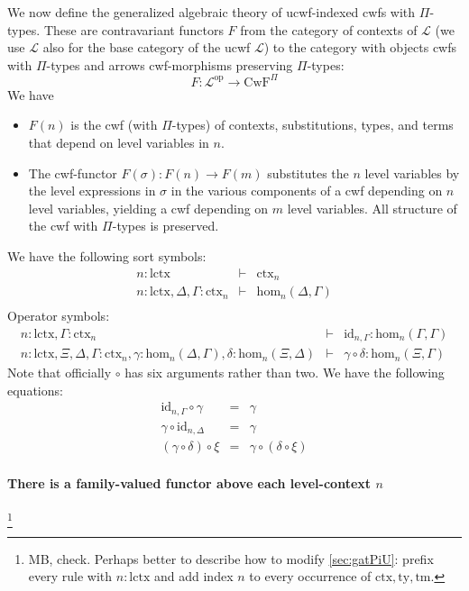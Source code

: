 \documentclass[11pt,a4paper]{article}
\theoremstyle{definition}
\newcommand{\id}{\mathsf{id}}
\def\Hom{\mathrm{hom}}
\def\id{\mathrm{id}}
\def\lctx{\mathrm{lctx}}
\newcommand{\ctx}{\mathrm{ctx}}
\newcommand{\ty}{\mathrm{ty}}
\newcommand{\tm}{\mathrm{tm}}
\def\L{{\mathcal{L}}}
\def\CwF{\mathrm{CwF}}
\begin{document}
We now define the generalized algebraic theory of ucwf-indexed cwfs with $\Pi$-types. These are contravariant functors $F$ from the category of contexts of $\L$ (we use $\L$ also for the base category of the ucwf $\L$)  to the category with objects cwfs with $\Pi$-types and arrows cwf-morphisms preserving $\Pi$-types:
$$
F : \L^\mathrm{op} \to \CwF^{\Pi}
$$
We have
\begin{itemize}
\item
$F(n)$ is the cwf (with $\Pi$-types) of contexts, substitutions, types, and terms that depend on level variables in $n$.
\item
The cwf-functor $F(\sigma) : F(n) \to F(m)$ substitutes the $n$ level variables by the level expressions in $\sigma$ in the various components of a cwf depending on $n$ level variables, yielding a cwf depending on $m$ level variables. All structure of the cwf with $\Pi$-types is preserved.
\end{itemize}
We have the following sort symbols:
\begin{eqnarray*}
n : \lctx &\vdash& \ctx_n\\
n : \lctx, \Delta, \Gamma : \ctx_n &\vdash& \Hom_n(\Delta,\Gamma)\\
\end{eqnarray*}
Operator symbols:
\begin{eqnarray*}
n : \lctx, \Gamma : \ctx_n &\vdash& \id_{n,\Gamma} : \Hom_n(\Gamma,\Gamma)\\
n : \lctx, \Xi,\Delta,\Gamma : \ctx_n, \gamma : \Hom_n(\Delta,\Gamma), \delta : \Hom_n(\Xi,\Delta) &\vdash&
\gamma \circ \delta : \Hom_n(\Xi,\Gamma)
\end{eqnarray*}
Note that officially $\circ$ has six arguments rather than two.
We have the following equations:
\begin{eqnarray*}
\id_{n,\Gamma} \circ \gamma &=& \gamma \\
 \gamma \circ \id_{n,\Delta} &=& \gamma \\
(\gamma \circ \delta) \circ \xi &=& \gamma \circ (\delta \circ \xi)
\end{eqnarray*}


\paragraph{There is a family-valued functor above each level-context $n$}

\footnote{MB, check. Perhaps better to describe how to modify \ref{sec:gatPiU}:
prefix every rule with $n:\lctx$ and add index $n$ to every occurrence
of $\ctx,\ty,\tm$.}
\end{document}
